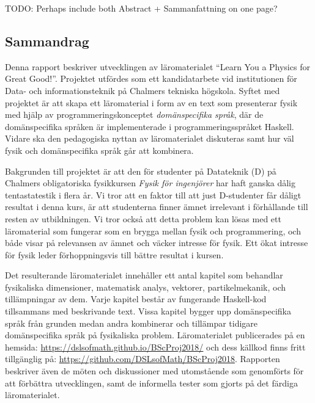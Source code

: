 
\thispagestyle{plain}			%

TODO: Perhaps include both Abstract + Sammanfattning on one page?

\begin{binge}

\section*{Sammandrag}

Denna rapport beskriver utvecklingen av läromaterialet ``Learn You a
Physics for Great Good!''. Projektet utfördes som ett kandidatarbete vid institutionen
för Data- och informationsteknik på Chalmers tekniska högskola. Syftet
med projektet är att skapa ett läromaterial i form av en text som
presenterar fysik med hjälp av programmeringskonceptet
\textit{domänspecifika språk}, där de domänspecifika språken är
implementerade i programmeringsspråket Haskell. Vidare ska 
den pedagogiska nyttan av läromaterialet diskuteras samt hur väl fysik och
domänspecifika språk går att kombinera.

Bakgrunden till projektet är att den för studenter på Datateknik (D) på
Chalmers obligatoriska fysikkursen \textit{Fysik för ingenjörer} har
haft ganska dålig tentastatestik i flera år. Vi tror att en
faktor till att just D-studenter får dåligt resultat i denna
kurs, är att studenterna finner ämnet irrelevant i förhållande till
resten av utbildningen. Vi tror också att detta problem kan lösas med ett
läromaterial som fungerar som en brygga mellan fysik och
programmering, och både visar på relevansen av ämnet och väcker
intresse för fysik. Ett ökat intresse för fysik leder förhoppningsvis
till bättre resultat i kursen.

Det resulterande läromaterialet innehåller ett antal kapitel som
behandlar fysikaliska dimensioner, matematisk analys,
vektorer, partikelmekanik, och tillämpningar av dem. Varje kapitel
består av fungerande Haskell-kod tillsammans med beskrivande
text. Vissa kapitel bygger upp domänspecifika språk från grunden medan
andra kombinerar och tillämpar tidigare domänspecifika språk på
fysikaliska problem. Läromaterialet publicerades på en hemsida:
\url{https://dslsofmath.github.io/BScProj2018/} och dess källkod finns
fritt tillgänglig på:
\url{https://github.com/DSLsofMath/BScProj2018}. Rapporten beskriver
även de möten och diskussioner med utomstående som genomförts för att
förbättra utvecklingen, samt de informella tester som gjorts på det
färdiga läromaterialet.


\end{binge}
